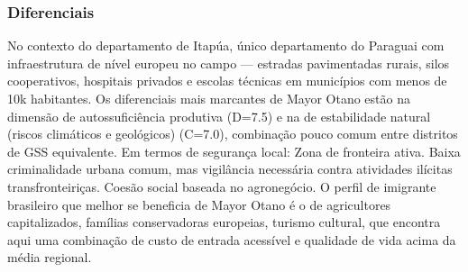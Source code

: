 \subsubsection*{Diferenciais}\label{dif-mayor-otano-0730}
No contexto do departamento de Itapúa, único departamento do Paraguai com infraestrutura de nível europeu no campo — estradas pavimentadas rurais, silos cooperativos, hospitais privados e escolas técnicas em municípios com menos de 10k habitantes. Os diferenciais mais marcantes de Mayor Otano estão na dimensão de autossuficiência produtiva (D=7.5) e na de estabilidade natural (riscos climáticos e geológicos) (C=7.0), combinação pouco comum entre distritos de GSS equivalente. Em termos de segurança local: Zona de fronteira ativa. Baixa criminalidade urbana comum, mas vigilância necessária contra atividades ilícitas transfronteiriças. Coesão social baseada no agronegócio. O perfil de imigrante brasileiro que melhor se beneficia de Mayor Otano é o de agricultores capitalizados, famílias conservadoras europeias, turismo cultural, que encontra aqui uma combinação de custo de entrada acessível e qualidade de vida acima da média regional.
